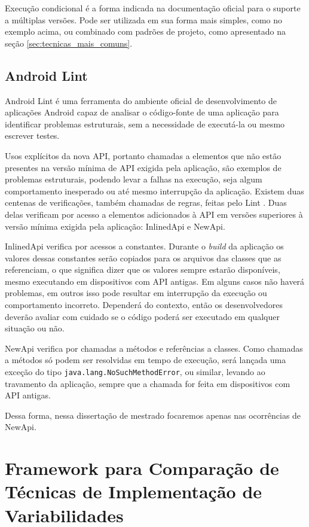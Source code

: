 Execução condicional é a forma indicada na documentação oficial
\cite{SupportDifferentVersions} para o suporte a múltiplas versões. Pode ser
utilizada em sua forma mais simples, como no exemplo acima, ou combinado com
padrões de projeto, como apresentado na seção \ref{sec:tecnicas_mais_comuns}.


\subsection{Android Lint}
\label{subsec:android-lint}

Android Lint \cite{Lint2016} é uma ferramenta do ambiente oficial de desenvolvimento
de aplicações Android capaz de analisar o código-fonte de uma aplicação para identificar
problemas estruturais, sem a necessidade de executá-la ou mesmo escrever testes.

Usos explícitos da nova API, portanto chamadas a elementos que não estão presentes
na versão mínima de API exigida pela aplicação, são exemplos de problemas estruturais,
podendo levar a falhas na execução, seja algum comportamento inesperado ou até
mesmo interrupção da aplicação. Existem duas centenas de verificações, também
chamadas de regras, feitas pelo Lint \cite{LintChecks}. Duas delas verificam por
acesso a elementos adicionados à API em versões superiores à versão mínima exigida
pela aplicação: InlinedApi e NewApi.

InlinedApi verifica por acessos a constantes. Durante o \textit{build} da aplicação os
valores dessas constantes serão copiados para os arquivos das classes que as
referenciam, o que significa dizer que os valores sempre estarão disponíveis,
mesmo executando em dispositivos com API antigas. Em alguns casos não haverá
problemas, em outros isso pode resultar em interrupção da execução ou comportamento
incorreto. Dependerá do contexto, então os desenvolvedores deverão avaliar com cuidado
se o código poderá ser executado em qualquer situação ou não.

NewApi verifica por chamadas a métodos e referências a classes. Como chamadas a
métodos só podem ser resolvidas em tempo de execução, será lançada uma exceção do
tipo \texttt{java.lang.NoSuchMethodError}, ou similar, levando ao travamento da
aplicação, sempre que a chamada for feita em dispositivos com API antigas.

Dessa forma, nessa dissertação de mestrado focaremos apenas nas ocorrências de NewApi.


\section{Framework para Comparação de Técnicas de Implementação de Variabilidades}
\label{sec:framework}

